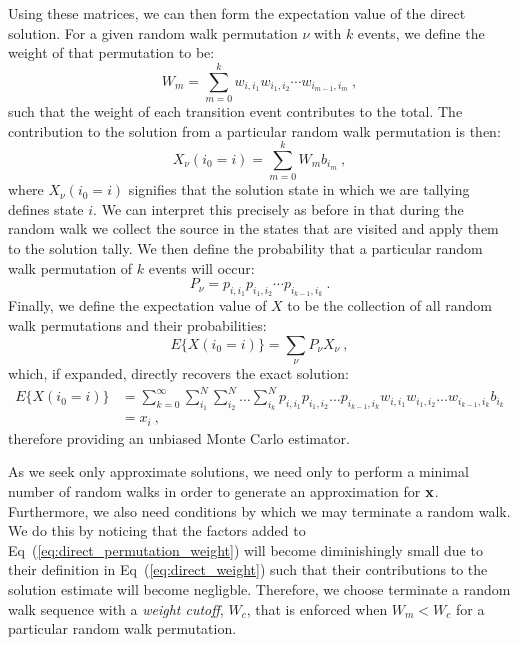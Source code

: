 Using these matrices, we can then form the expectation value of the
direct solution. For a given random walk permutation $\nu$ with $k$
events, we define the weight of that permutation to be:
\begin{equation}
  W_{m} = \sum_{m=0}^k w_{i,i_1} w_{i_1,i_2} \cdots w_{i_{m-1},i_m}\:,
  \label{eq:direct_permutation_weight}
\end{equation}
such that the weight of each transition event contributes to the
total. The contribution to the solution from a particular random walk
permutation is then:
\begin{equation}
  X_{\nu}(i_0 = i) = \sum_{m=0}^k W_{m} b_{i_m}\:,
  \label{eq:direct_permutation_contribution}
\end{equation}
where $X_{\nu}(i_0 = i)$ signifies that the solution state in which we
are tallying defines state $i$.  We can interpret this precisely as
before in that during the random walk we collect the source in the
states that are visited and apply them to the solution tally. We then
define the probability that a particular random walk permutation of
$k$ events will occur:
\begin{equation}
  P_{\nu} = p_{i,i_1} p_{i_1,i_2} \cdots p_{i_{k-1},i_k}\:.
  \label{eq:direct_permutation_probability}
\end{equation}
Finally, we define the expectation value of $X$ to be the collection
of all random walk permutations and their probabilities:
\begin{equation}
  E\{X(i_0 = i)\} = \sum_{\nu} P_{\nu} X_{\nu}\:,
  \label{eq:direct_expectation_value}
\end{equation}
which, if expanded, directly recovers the exact solution:
\begin{equation}
  \begin{split}
    E\{X(i_0 = i)\}
    &=\sum_{k=0}^{\infty}\sum_{i_1}^{N}\sum_{i_2}^{N}\ldots
    \sum_{i_k}^{N} p_{i,i_1}p_{i_1,i_2}\ldots p_{i_{k-1},i_k}
    w_{i,i_1}w_{i_1,i_2}\ldots w_{i_{k-1},i_k} b_{i_k}\\ &= x_i\:,
  \end{split}
  \label{eq:direct_expectation_expansion}
\end{equation}
therefore providing an unbiased Monte Carlo estimator. 

As we seek only approximate solutions, we need only to perform a
minimal number of random walks in order to generate an approximation
for $\mathbf{x}$. Furthermore, we also need conditions by which we may
terminate a random walk. We do this by noticing that the factors added
to Eq~(\ref{eq:direct_permutation_weight}) will become diminishingly
small due to their definition in Eq~(\ref{eq:direct_weight}) such that
their contributions to the solution estimate will become
negligble. Therefore, we choose terminate a random walk sequence with
a \textit{weight cutoff}, $W_c$, that is enforced when $W_m < W_c$ for
a particular random walk permutation.

